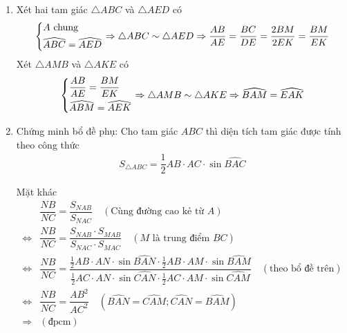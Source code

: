 \begin{ex}
{\begin{enumerate}
	\item Xét hai tam giác $ \triangle ABC $ và $ \triangle AED $ có
	\begin{align*}
		\left\{\begin{aligned}& A \textrm{ chung}\\
		& \widehat{ABC} = \widehat{AED}\end{aligned}\right.
		\Rightarrow \triangle ABC \sim \triangle AED
		\Rightarrow \dfrac{AB}{AE} = \dfrac{BC}{DE} = \dfrac{2BM}{2EK} = \dfrac{BM}{EK}
	\end{align*}
	Xét $ \triangle AMB $ và $ \triangle AKE $ có
	\begin{align*}
	\left\{\begin{aligned}& \dfrac{AB}{AE} = \dfrac{BM}{EK}\\
		& \widehat{ABM} = \widehat{AEK}\end{aligned}\right.
		\Rightarrow \triangle AMB \sim \triangle AKE
		\Rightarrow \widehat{BAM} = \widehat{EAK}
	\end{align*}
	
	\item Chứng minh bổ đề phụ: Cho tam giác $ ABC $ thì diện tích tam giác được tính theo công thức
	\begin{align*}
	S_{\triangle ABC} = \dfrac{1}{2} AB \cdot AC \cdot \sin \widehat{BAC}
	\end{align*}
	{
	}
	Mặt khác
	\begin{align*}
	& \dfrac{NB}{NC} = \dfrac{S_{NAB}}{S_{NAC}} \quad \left( \textrm{Cùng đường cao kẻ từ }A \right)\\
	\Leftrightarrow & \dfrac{NB}{NC} = \dfrac{S_{NAB} \cdot S_{MAB}}{S_{NAC} \cdot S_{MAC}} \quad \left( M \textrm{ là trung điểm }BC \right)\\
	\Leftrightarrow & \dfrac{NB}{NC} = \dfrac{\frac{1}{2} AB \cdot AN \cdot \sin \widehat{BAN} \cdot \frac{1}{2} AB \cdot AM \cdot \sin \widehat{BAM}}{\frac{1}{2} AC \cdot AN \cdot \sin \widehat{CAN} \cdot \frac{1}{2} AC \cdot AM \cdot \sin \widehat{CAM}} \quad \left( \textrm{theo bổ đề trên} \right)\\
	\Leftrightarrow & \dfrac{NB}{NC} = \dfrac{AB^2}{AC^2} \quad \left( \widehat{BAN} = \widehat{CAM}; \widehat{CAN} = \widehat{BAM} \right)\\
	\Rightarrow & \left(\textrm{đpcm}\right)
	\end{align*}
\end{enumerate}	
}
\end{ex}

